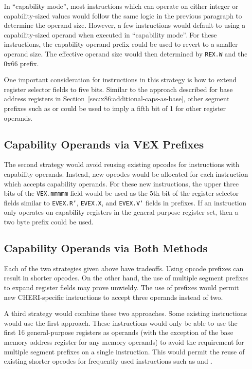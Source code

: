 In ``capability mode'', most instructions which can operate on either
integer or capability-sized values would follow the same logic in the
previous paragraph to determine the operand size.  However, a few
instructions would default to using a capability-sized operand when
executed in ``capability mode''.  For these instructions, the
capability operand prefix could be used to revert to a smaller operand
size.  The effective operand size would then determined by \texttt{REX.W}
and the 0x66 prefix.

One important consideration for instructions in this strategy is how
to extend register selector fields to five bits.  Similar to the
approach described for base address registers in
Section~\ref{sec:x86:additional-caps-as-base}, other segment prefixes
such as \FS{} or \ES{} could be used to imply a fifth bit of 1 for
other register operands.

\subsection{Capability Operands via VEX Prefixes}

The second strategy would avoid reusing existing opcodes for
instructions with capability operands.  Instead, new opcodes would be
allocated for each instruction which accepts capability operands.  For
these new instructions, the upper three bits of the \texttt{VEX.mmmmm}
field would be used as the 5th bit of the register selector fields
similar to \texttt{EVEX.R'}, \texttt{EVEX.X}, and \texttt{EVEX.V'}
fields in \EVEX{} prefixes.  If an instruction only operates on
capability registers in the general-purpose register set, then a two
byte \VEX{} prefix could be used.

\subsection{Capability Operands via Both Methods}

Each of the two strategies given above have tradeoffs.  Using opcode
prefixes can result in shorter opcodes.  On the other hand, the use of
multiple segment prefixes to expand register fields may prove
unwieldy.  The use of \VEX{} prefixes would permit new CHERI-specific
instructions to accept three operands instead of two.

A third strategy would combine these two approaches.  Some existing
instructions would use the first approach.  These instructions would
only be able to use the first 16 general-purpose registers as operands
(with the exception of the base memory address register for any memory
operands) to avoid the requirement for multiple segment prefixes on a
single instruction.  This would permit the reuse of existing shorter
opcodes for frequently used instructions such as  and
.

